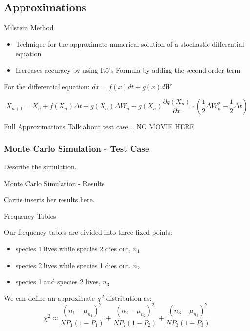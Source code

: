 \subsection{Approximations}

\begin{frame}{Milstein Method}

	\begin{itemize}
		\item Technique for the approximate numerical solution of a stochastic differential equation
		\item Increases accuracy by using It\^o's Formula by adding the second-order term
	\end{itemize} 
	
	\vfill
	
	For the differential equation: $dx = f(x) dt + g(x) dW$ 
	
		$$X_{n+1} = X_n + f(X_n)\Delta t + g(X_n) \Delta W_n + g(X_n) \frac{\partial g(X_n)}{\partial x}  \cdot \left(\frac{1}{2} \Delta W_n ^2 - \frac{1}{2} \Delta t \right)$$
	
	\vfill

\end{frame}

\begin{frame}{Full Approximations}
Talk about test case... NO MOVIE HERE 
\end{frame}


\begin{frame}
   \frametitle{Monte Carlo Simulation - Test Case}

   Describe the simulation.

\end{frame}

\begin{frame}{Monte Carlo Simulation - Results}

Carrie inserts her results here. 

\end{frame}

\begin{frame}{Frequency Tables}

Our frequency tables are divided into three fixed points: 

\begin{itemize}
	\item species 1 lives while species 2 dies out, $n_1$
	\item species 2 lives while species 1 dies out, $n_2$
	\item species 1 and species 2 lives, $n_3$
\end{itemize}
We can define an approximate $\chi^2$ distribution as:
$$ \chi^2 \approx \frac{\left(n_1 - \mu_{n_1}\right)^2}{N P_1 (1 - P_1)} + 
                  \frac{\left(n_2 - \mu_{n_2}\right)^2}{N P_2 (1 - P_2)} +
									\frac{\left(n_3 - \mu_{n_3}\right)^2}{N P_3 (1 - P_3)}$$
\end{frame}

